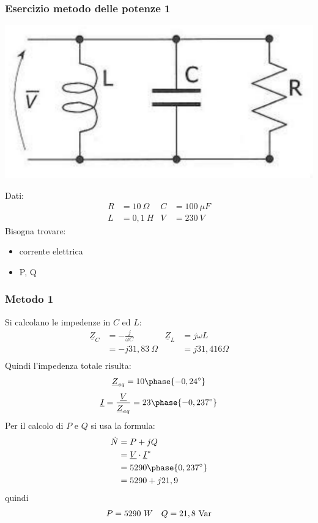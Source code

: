 \documentclass{article}
\begin{document}
\subsubsection{Esercizio metodo delle potenze 1}
\begin{center}
    \includegraphics[scale=0.27]{Image/Esercizio_potenze_1.png}
\end{center}
Dati:
\begin{align*}
    R &= 10 \ \Omega & C &= 100 \ \mu F\\
    L &= 0,1 \ H & V &= 230 \ V
\end{align*}
Bisogna trovare:
\begin{itemize}
    \item corrente elettrica
    \item P, Q
\end{itemize}
\subsubsection*{Metodo 1}
Si calcolano le impedenze in $C$ ed $L$:
\begin{align*}
    \underline{Z}_C &= -\frac{j}{\omega C} & \underline{Z}_L &= j \omega L
    \\
    &= -j31,83 \ \Omega &
    &= j31,416 \Omega
    \\
\end{align*}
Quindi l'impedenza totale risulta:
\[\underline{Z}_{eq} = 10 \phase{-0,24^{\circ}}\]
\[\underline{I} = \frac{\underline{V}}{\underline{Z}_{eq}} = 23 \phase{-0,237^{\circ}}\]
Per il calcolo di $P$ e $Q$ si usa la formula:
\begin{align*}
    \dot N &= P+jQ
    \\
    &=\underline{V}\cdot \underline{I}^*
    \\
    &=5290 \phase{0,237^{\circ}}
    \\
    &= 5290 + j21,9
\end{align*}
quindi
\begin{align*}
    P &= 5290 \ W &  Q = 21,8 \ \text{Var}
\end{align*}
\end{document}
